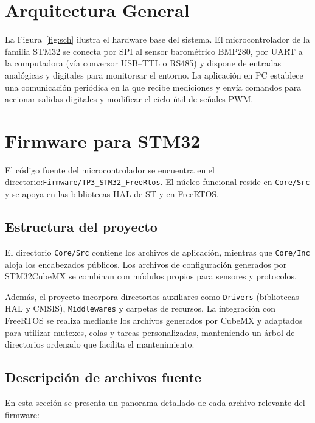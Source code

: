 \documentclass{article}
\begin{document}
\section{Arquitectura General}
La Figura~\ref{fig:sch} ilustra el hardware base del sistema. El microcontrolador de la familia STM32 se conecta por SPI al sensor barométrico BMP280, por UART a la computadora (vía conversor USB--TTL o RS485) y dispone de entradas analógicas y digitales para monitorear el entorno. La aplicación en PC establece una comunicación periódica en la que recibe mediciones y envía comandos para accionar salidas digitales y modificar el ciclo útil de señales PWM.

\section{Firmware para STM32}
El código fuente del microcontrolador se encuentra en el directorio:\linebreak\texttt{Firmware/TP3\_STM32\_FreeRtos}. El núcleo funcional reside en \texttt{Core/Src} y se apoya en las bibliotecas HAL de ST y en FreeRTOS.

\subsection{Estructura del proyecto}
El directorio \texttt{Core/Src} contiene los archivos de aplicación, mientras que \texttt{Core/Inc} aloja los encabezados públicos. Los archivos de configuración generados por STM32CubeMX se combinan con módulos propios para sensores y protocolos.

Además, el proyecto incorpora directorios auxiliares como \texttt{Drivers} (bibliotecas HAL y CMSIS), \texttt{Middlewares} y carpetas de recursos. La integración con FreeRTOS se realiza mediante los archivos generados por CubeMX y adaptados para utilizar mutexes, colas y tareas personalizadas, manteniendo un árbol de directorios ordenado que facilita el mantenimiento.

\subsection{Descripción de archivos fuente}
En esta sección se presenta un panorama detallado de cada archivo relevante del firmware:
\end{document}
